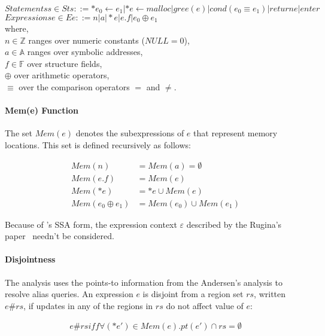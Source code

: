 $Statements s\in St s::= *e_0\gets e_1 | *e\gets malloc | gree(e) | 
cond(e_0\equiv e_1) | return e | enter$ \\

$Expressions e\in E e::= n | a | *e | e.f | e_0 \oplus e_1 $ \\

where, \\
$n\in \mathbb{Z}$ ranges over numeric constants ($NULL=0$), \\
$a\in \mathbb{A}$ ranges over symbolic addresses, \\
$f\in \mathbb{F}$ over structure fields, \\
$\oplus$ over arithmetic operators, \\
$\equiv$ over the comparison operators $=$ and $\ne$.

\paragraph{Mem(e) Function} 

The set $Mem(e)$ denotes the subexpressions of $e$ that represent memory 
locations. This set is defined recursively as follows:

\begin{align*}
  Mem(n) &= Mem(a)=\emptyset \\
Mem(e.f) &= Mem(e) \\
 Mem(*e) &={*e}\cup Mem(e) \\
Mem(e_0 \oplus e_1) &= Mem(e_0)\cup Mem(e_1)
\end{align*}


Because of \llvm's SSA form, the expression context $\varepsilon$ described 
by the Rugina's paper~\cite{rugina} needn't be considered.

\paragraph{Disjointness}

The analysis uses the points-to information from the Andersen's analysis 
to resolve alias queries. An expression $e$ is disjoint from a region set 
$rs$, written $e\#rs$, if updates in any of the regions in $rs$ do not 
affect value of $e$:

\begin{align*}
e\#rs iff \forall(*e')\in Mem(e). pt(e')\cap rs=\emptyset
\end{align*}



